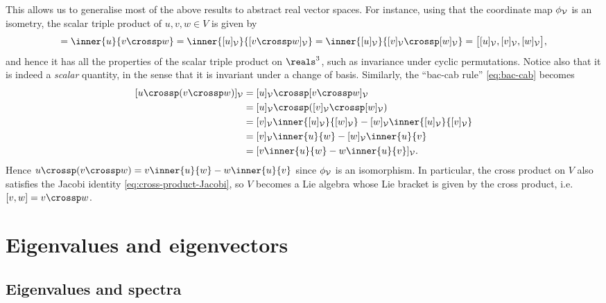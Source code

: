 \documentclass[a4paper, 11pt]{memoir}
\numberwithin{equation}{chapter}
\newcommand{\calV}{\mathcal{V}}
\begin{document}
This allows us to generalise most of the above results to abstract real vector spaces. For instance, using that the coordinate map $\coordmap{\calV}$ is an isometry, the scalar triple product of $u,v,w \in V$ is given by
%
\begin{equation*}
    [u,v,w]
        = \inner{u}{v \crossp w}
        = \inner{\coordvec{u}{\calV}}{\coordvec{v \crossp w}{\calV}}
        = \inner{\coordvec{u}{\calV}}{\coordvec{v}{\calV} \crossp \coordvec{w}{\calV}}
        = \bigl[ \coordvec{u}{\calV}, \coordvec{v}{\calV}, \coordvec{w}{\calV} \bigr],
\end{equation*}
%
and hence it has all the properties of the scalar triple product on $\reals^3$, such as invariance under cyclic permutations. Notice also that it is indeed a \emph{scalar} quantity, in the sense that it is invariant under a change of basis. Similarly, the \enquote{bac-cab rule} \cref{eq:bac-cab} becomes
%
\begin{align*}
    \coordvec{u \crossp (v \crossp w)}{\calV}
        &= \coordvec{u}{\calV} \crossp \coordvec{v \crossp w}{\calV} \\
        &= \coordvec{u}{\calV} \crossp (\coordvec{v}{\calV} \crossp \coordvec{w}{\calV}) \\
        &= \coordvec{v}{\calV} \inner{\coordvec{u}{\calV}}{\coordvec{w}{\calV}} - \coordvec{w}{\calV} \inner{\coordvec{u}{\calV}}{\coordvec{v}{\calV}} \\
        &= \coordvec{v}{\calV} \inner{u}{w} - \coordvec{w}{\calV} \inner{u}{v} \\
        &= \coordvec{ v \inner{u}{w} - w \inner{u}{v} }{\calV}.
\end{align*}
%
Hence $u \crossp (v \crossp w) = v \inner{u}{w} - w \inner{u}{v}$ since $\coordmap{\calV}$ is an isomorphism. In particular, the cross product on $V$ also satisfies the Jacobi identity \cref{eq:cross-product-Jacobi}, so $V$ becomes a Lie algebra whose Lie bracket is given by the cross product, i.e. $[v,w] = v \crossp w$.


\chapter{Eigenvalues and eigenvectors}

\section{Eigenvalues and spectra}

\newcommand{\geo}{\mathrm{Geo}}
\end{document}
